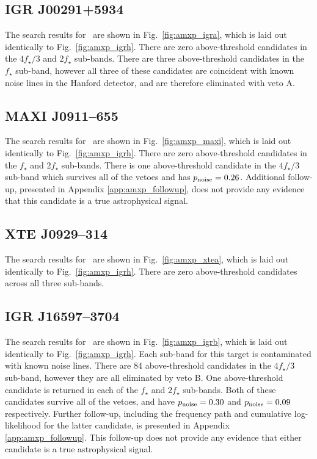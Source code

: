 \subsection{IGR J00291+5934  \label{sec:amxp_igra} }
The search results for \igra\ are shown in Fig.~\ref{fig:amxp_igra}, which is laid out identically to Fig.~\ref{fig:amxp_igrh}. There are zero above-threshold candidates in the $4f_\star / 3$ and $2f_\star$ sub-bands. There are three above-threshold candidates in the $f_\star$ sub-band, however all three of these candidates are coincident with known noise lines in the Hanford detector, and are therefore eliminated with veto A.

\subsection{MAXI J0911--655  \label{sec:amxp_maxi} }
The search results for \maxi\ are shown in Fig.~\ref{fig:amxp_maxi}, which is laid out identically to Fig.~\ref{fig:amxp_igrh}. There are zero above-threshold candidates in the $f_\star$ and $2f_\star$ sub-bands. There is one above-threshold candidate in the $4f_\star / 3$ sub-band which survives all of the vetoes and has $p_{\rm noise}=0.26$. Additional follow-up, presented in Appendix \ref{app:amxp_followup}, does not provide any evidence that this candidate is a true astrophysical signal.

\subsection{XTE J0929--314  \label{sec:amxp_xtea} }
The search results for \xtea\ are shown in Fig.~\ref{fig:amxp_xtea}, which is laid out identically to Fig.~\ref{fig:amxp_igrh}. There are zero above-threshold candidates across all three sub-bands.

\subsection{IGR J16597--3704  \label{sec:amxp_igrb} }
The search results for \igrb\ are shown in Fig.~\ref{fig:amxp_igrb}, which is laid out identically to Fig.~\ref{fig:amxp_igrh}. Each sub-band for this target is contaminated with known noise lines. There are 84 above-threshold candidates in the $4f_\star / 3$ sub-band, however they are all eliminated by veto B. One above-threshold candidate is returned in each of the $f_\star$ and $2f_\star$ sub-bands. Both of these candidates survive all of the vetoes, and have $p_{\rm noise}=0.30$ and $p_{\rm noise}=0.09$ respectively. Further follow-up, including the frequency path and cumulative log-likelihood for the latter candidate, is presented in Appendix \ref{app:amxp_followup}. This follow-up does not provide any evidence that either candidate is a true astrophysical signal.

